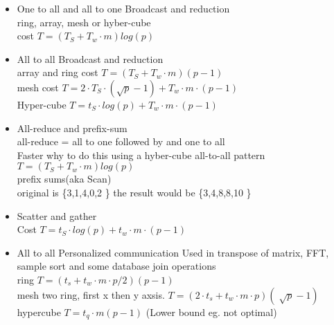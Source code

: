 \documentclass[a4paper,10pt,titlepage]{report}
\begin{document}
\begin{itemize}
\item One to all and all to one Broadcast and reduction\\
\hspace{5mm}	ring, array, mesh or hyber-cube \\
\hspace{5mm}    cost $ T = (T_S + T_w \cdot m) log (p) $
\item All to all Broadcast and reduction \\
\hspace{5mm}	array and ring cost $T = (T_S + T_w \cdot m) (p -1) $ \\
\hspace{5mm}    mesh cost $T = 2 \cdot T_S \cdot(\sqrt{p}-1)+ T_w \cdot m \cdot (p -1) $ \\
\hspace{5mm}    Hyper-cube $T = t_S \cdot log (p) + T_w \cdot m \cdot(p-1) $
\item All-reduce and prefix-sum \\
\hspace{5mm}		all-reduce = all to one followed by and one to all\\
\hspace{5mm}        Faster why to do this using a hyber-cube all-to-all pattern $T = (T_S + T_w \cdot m) log (p)$ \\
\hspace{5mm}        prefix sums(aka Scan)  \\
\hspace{5mm}        original is \{3,1,4,0,2 \} the result would be \{3,4,8,8,10 \}
\item Scatter and gather \\
\hspace{5mm}	Cost $T = t_S \cdot log (p) + t_w \cdot m \cdot (p-1)$
\item All to all Personalized communication
\hspace{5mm}		Used in transpose of matrix, FFT, sample sort and some database join operations \\
\hspace{5mm}        ring $T = (t_s + t_w \cdot m \cdot p / 2)(p-1)$ \\
\hspace{5mm}        mesh two ring, first x then y axsis. $T = (2\cdot t_s + t_w \cdot m \cdot p )(\sqrt[]{p}-1)$\\
\hspace{5mm}        hypercube $T = t_q \cdot m(p-1)$ (Lower bound eg. not optimal) \\

\end{itemize}
\end{document}
